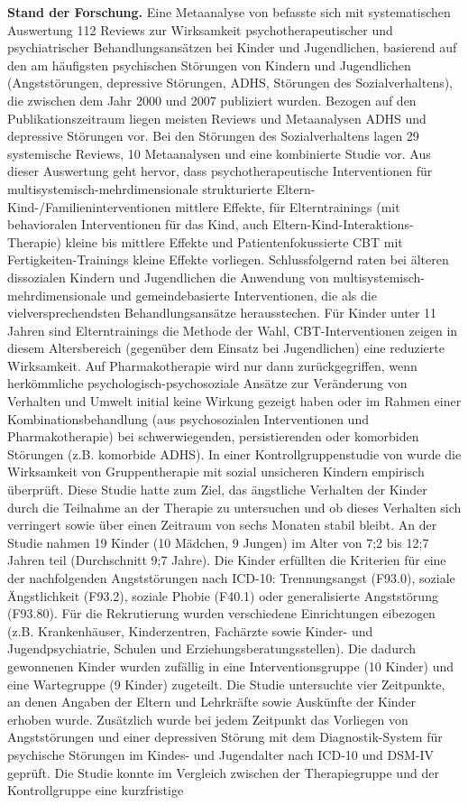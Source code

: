 \textbf{Stand der Forschung.} Eine Metaanalyse von  befasste sich mit systematischen Auswertung 112 Reviews zur Wirksamkeit psychotherapeutischer und psychiatrischer Behandlungsansätzen bei Kinder und Jugendlichen,
basierend auf den am häufigsten psychischen Störungen von Kindern und Jugendlichen (Angststörungen, depressive Störungen,
ADHS, Störungen des Sozialverhaltens), die zwischen dem Jahr 2000 und 2007 publiziert wurden. Bezogen auf den Publikationszeitraum liegen meisten Reviews und Metaanalysen ADHS und depressive Störungen vor. Bei den Störungen des Sozialverhaltens lagen 29 systemische Reviews, 10 Metaanalysen und eine kombinierte Studie vor. Aus dieser Auswertung geht hervor, dass psychotherapeutische Interventionen für multisystemisch-mehrdimensionale strukturierte Eltern-Kind-/Familieninterventionen mittlere Effekte, für Elterntrainings (mit behavioralen Interventionen für das Kind, auch Eltern-Kind-Interaktions-Therapie) kleine bis mittlere Effekte und Patientenfokussierte CBT mit Fertigkeiten-Trainings kleine Effekte vorliegen. Schlussfolgernd raten  bei älteren dissozialen Kindern und Jugendlichen die Anwendung von multisystemisch-mehrdimensionale und gemeindebasierte Interventionen, die als die vielversprechendsten Behandlungsansätze herausstechen. Für Kinder unter 11 Jahren sind Elterntrainings die Methode der Wahl, CBT-Interventionen zeigen in diesem Altersbereich (gegenüber dem Einsatz bei Jugendlichen) eine reduzierte Wirksamkeit. Auf Pharmakotherapie wird nur dann zurückgegriffen, wenn herkömmliche psychologisch-psychosoziale Ansätze zur Veränderung von Verhalten und Umwelt initial keine Wirkung gezeigt haben oder im Rahmen einer Kombinationsbehandlung (aus psychosozialen Interventionen und Pharmakotherapie) bei schwerwiegenden, persistierenden oder komorbiden Störungen (z.B. komorbide ADHS). In einer Kontrollgruppenstudie von  wurde die Wirksamkeit von Gruppentherapie mit sozial unsicheren Kindern empirisch überprüft. Diese Studie hatte zum Ziel, das ängstliche Verhalten der Kinder durch die Teilnahme an der Therapie zu untersuchen und ob dieses Verhalten sich verringert sowie über einen Zeitraum von sechs Monaten stabil bleibt. An der Studie nahmen 19 Kinder (10 Mädchen, 9 Jungen) im Alter von 7;2 bis 12;7 Jahren teil (Durchschnitt 9;7 Jahre). Die Kinder erfüllten die Kriterien für eine der nachfolgenden Angststörungen nach ICD-10: Trennungsangst (F93.0), soziale Ängstlichkeit (F93.2), soziale Phobie (F40.1) oder generalisierte Angststörung (F93.80). Für die Rekrutierung wurden verschiedene Einrichtungen eibezogen (z.B. Krankenhäuser, Kinderzentren, Fachärzte sowie Kinder- und Jugendpsychiatrie, Schulen und Erziehungsberatungsstellen). Die dadurch gewonnenen Kinder wurden zufällig in eine Interventionsgruppe (10 Kinder) und eine Wartegruppe (9 Kinder) zugeteilt. Die Studie untersuchte vier Zeitpunkte, an denen Angaben der Eltern und Lehrkräfte sowie Auskünfte der Kinder erhoben wurde. Zusätzlich wurde bei jedem Zeitpunkt das Vorliegen von Angststörungen und einer depressiven Störung mit dem Diagnostik-System für psychische Störungen im Kindes- und Jugendalter nach ICD-10 und DSM-IV geprüft. Die Studie konnte im Vergleich zwischen der Therapiegruppe und der Kontrollgruppe eine kurzfristige 